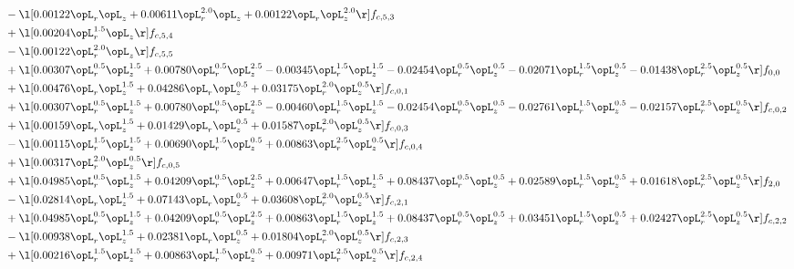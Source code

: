 \begin{alignat}{2}
& - \l[  0.00122 \opL_r \opL_z +  0.00611 \opL_r^{2.0} \opL_z +  0.00122 \opL_r \opL_z^{2.0}  \r] f_{c,5,3} \nonumber \\ 
& + \l[  0.00204 \opL_r^{1.5} \opL_z  \r] f_{c,5,4} \nonumber \\ 
& - \l[  0.00122 \opL_r^{2.0} \opL_z  \r] f_{c,5,5} \nonumber \\ 
& + \l[  0.00307 \opL_r^{0.5} \opL_z^{1.5} +  0.00780 \opL_r^{0.5} \opL_z^{2.5}   -0.00345 \opL_r^{1.5} \opL_z^{1.5}   -0.02454 \opL_r^{0.5} \opL_z^{0.5}   -0.02071 \opL_r^{1.5} \opL_z^{0.5}   -0.01438 \opL_r^{2.5} \opL_z^{0.5}  \r] f_{0,0} \nonumber \\ 
& + \l[  0.00476 \opL_r \opL_z^{1.5} +  0.04286 \opL_r \opL_z^{0.5} +  0.03175 \opL_r^{2.0} \opL_z^{0.5}  \r] f_{c,0,1} \nonumber \\ 
& + \l[  0.00307 \opL_r^{0.5} \opL_z^{1.5} +  0.00780 \opL_r^{0.5} \opL_z^{2.5}   -0.00460 \opL_r^{1.5} \opL_z^{1.5}   -0.02454 \opL_r^{0.5} \opL_z^{0.5}   -0.02761 \opL_r^{1.5} \opL_z^{0.5}   -0.02157 \opL_r^{2.5} \opL_z^{0.5}  \r] f_{c,0,2} \nonumber \\ 
& + \l[  0.00159 \opL_r \opL_z^{1.5} +  0.01429 \opL_r \opL_z^{0.5} +  0.01587 \opL_r^{2.0} \opL_z^{0.5}  \r] f_{c,0,3} \nonumber \\ 
& - \l[  0.00115 \opL_r^{1.5} \opL_z^{1.5} +  0.00690 \opL_r^{1.5} \opL_z^{0.5} +  0.00863 \opL_r^{2.5} \opL_z^{0.5}  \r] f_{c,0,4} \nonumber \\ 
& + \l[  0.00317 \opL_r^{2.0} \opL_z^{0.5}  \r] f_{c,0,5} \nonumber \\ 
& + \l[  0.04985 \opL_r^{0.5} \opL_z^{1.5} +  0.04209 \opL_r^{0.5} \opL_z^{2.5} +  0.00647 \opL_r^{1.5} \opL_z^{1.5} +  0.08437 \opL_r^{0.5} \opL_z^{0.5} +  0.02589 \opL_r^{1.5} \opL_z^{0.5} +  0.01618 \opL_r^{2.5} \opL_z^{0.5}  \r] f_{2,0} \nonumber \\ 
& - \l[  0.02814 \opL_r \opL_z^{1.5} +  0.07143 \opL_r \opL_z^{0.5} +  0.03608 \opL_r^{2.0} \opL_z^{0.5}  \r] f_{c,2,1} \nonumber \\ 
& + \l[  0.04985 \opL_r^{0.5} \opL_z^{1.5} +  0.04209 \opL_r^{0.5} \opL_z^{2.5} +  0.00863 \opL_r^{1.5} \opL_z^{1.5} +  0.08437 \opL_r^{0.5} \opL_z^{0.5} +  0.03451 \opL_r^{1.5} \opL_z^{0.5} +  0.02427 \opL_r^{2.5} \opL_z^{0.5}  \r] f_{c,2,2} \nonumber \\ 
& - \l[  0.00938 \opL_r \opL_z^{1.5} +  0.02381 \opL_r \opL_z^{0.5} +  0.01804 \opL_r^{2.0} \opL_z^{0.5}  \r] f_{c,2,3} \nonumber \\ 
& + \l[  0.00216 \opL_r^{1.5} \opL_z^{1.5} +  0.00863 \opL_r^{1.5} \opL_z^{0.5} +  0.00971 \opL_r^{2.5} \opL_z^{0.5}  \r] f_{c,2,4} \nonumber \\ 

\end{alignat}
